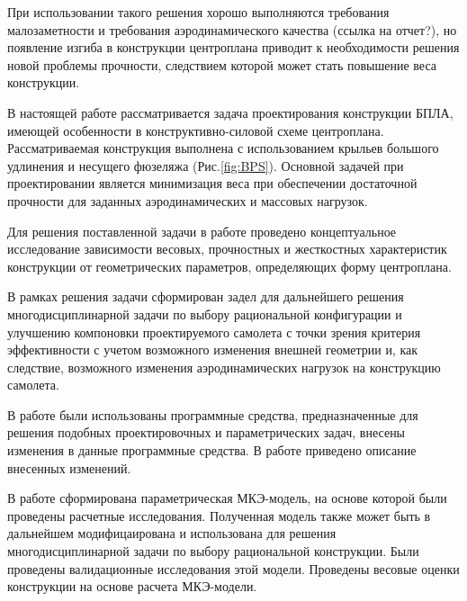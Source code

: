 При использовании такого решения хорошо выполняются требования малозаметности и требования аэродинамического качества (ссылка на отчет?), но появление изгиба в конструкции центроплана приводит к необходимости решения новой проблемы прочности, следствием которой может стать повышение веса конструкции. 

В настоящей работе рассматривается задача проектирования конструкции БПЛА, имеющей особенности в конструктивно-силовой схеме центроплана. Рассматриваемая конструкция выполнена с использованием крыльев большого удлинения и несущего фюзеляжа (Рис.\ref{fig:BPS}). Основной задачей при проектировании является минимизация веса при обеспечении достаточной прочности для заданных аэродинамических и массовых нагрузок.








Для решения поставленной задачи в работе проведено концептуальное исследование зависимости весовых, прочностных и жесткостных характеристик конструкции от геометрических параметров, определяющих форму центроплана.


В рамках решения задачи сформирован задел для дальнейшего решения многодисциплинарной задачи по выбору рациональной конфигурации и улучшению компоновки проектируемого самолета с точки зрения критерия эффективности с учетом возможного изменения внешней геометрии и, как следствие, возможного изменения аэродинамических нагрузок на конструкцию самолета. 

В работе были использованы программные средства, предназначенные для решения подобных проектировочных и параметрических задач, внесены изменения в данные программные средства. В работе приведено описание внесенных изменений.  

В работе сформирована параметрическая МКЭ-модель, на основе которой были проведены расчетные исследования. Полученная модель также может быть в дальнейшем модифицаирована и использована для решения многодисциплинарной задачи по выбору рациональной конструкции. Были проведены валидационные исследования этой модели. Проведены весовые оценки конструкции на основе расчета МКЭ-модели.   

 